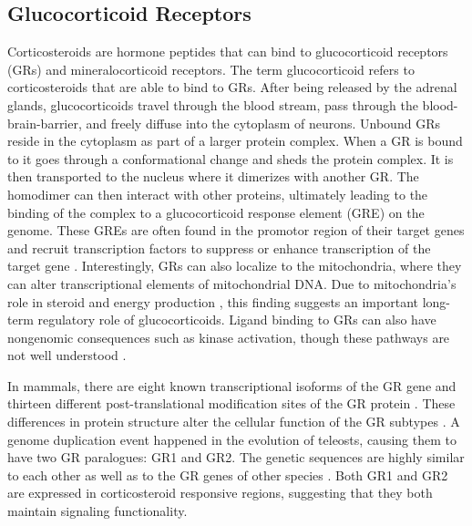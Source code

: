 \documentclass[12pt,twoside]{reedthesis}
\begin{document}
\subsection{Glucocorticoid Receptors}
Corticosteroids are hormone peptides that can bind to glucocorticoid receptors (GRs)
and mineralocorticoid receptors. The term glucocorticoid refers to
corticosteroids that are able to bind to GRs. After being
released by the adrenal glands, glucocorticoids travel through the blood stream,
pass through the blood-brain-barrier, and freely diffuse into the cytoplasm of
neurons. Unbound GRs reside in the cytoplasm as part of a larger protein
complex. When a GR is bound to it goes through a
conformational change and sheds the protein complex. It is then
transported to the nucleus where it dimerizes with another GR. The homodimer
can then interact with other proteins, ultimately leading to the binding of the
complex to a glucocorticoid response element (GRE) on the genome. These GREs are often
found in the promotor region of their target genes and recruit
transcription factors to suppress or enhance transcription of the target gene
\citep{2017Nrid, herman_limbic_2005}. Interestingly, GRs can also localize to the mitochondria,
where they can alter transcriptional elements of mitochondrial DNA. Due to
mitochondria's role in steroid and energy production \citep{lapp_stress_2019}, this finding
suggests an important long-term regulatory role of glucocorticoids. Ligand binding to GRs can also have nongenomic consequences such as kinase
activation, though these pathways are not well understood \citep{samarasinghe_nongenomic_2011}.

In mammals, there are eight known transcriptional isoforms of the GR gene \citep{saif_expression_2015} and
thirteen different post-translational modification sites of the GR protein \citep{oakley_biology_2013}. These differences in protein structure alter the
cellular function of the GR subtypes \citep{lu_selective_2007}. A genome duplication event happened in the evolution of teleosts, causing them
to have two GR paralogues: GR1 and GR2. The genetic sequences are
highly similar to each other as well as to the GR genes of other species \citep{greenwood_multiple_2003}.
Both GR1 and GR2 are expressed in corticosteroid
responsive regions,
suggesting that they both maintain signaling functionality.
\end{document}
